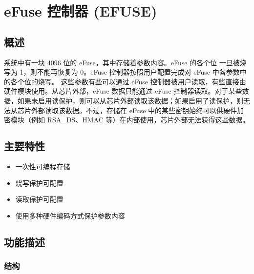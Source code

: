 \documentclass[main\_\_CN.tex]{subfiles}
\begin{document}

\ifglobal
\else
    {\let\clearpage\relax \listoftodos}
    \tableofcontents
\fi


\chapter{eFuse 控制器 (EFUSE)}
\label{mod:efuse}
\hypertarget{efuse}{}

\section{概述}

\chipname{} 系统中有一块 4096 位的 eFuse，其中存储着参数内容。eFuse 的各个位 一旦被烧写为 1，则不能再恢复为 0。eFuse 控制器按照用户配置完成对 eFuse 中各参数中的各个位的烧写。
这些参数有些可以通过 eFuse 控制器被用户读取，有些直接由硬件模块使用。从芯片外部，eFuse 数据只能通过 eFuse 控制器读取。对于某些数据，如果未启用读保护，则可以从芯片外部读取该数据；如果启用了读保护，则无法从芯片外部读取该数据。不过，存储在 eFuse 中的某些密钥始终可以供硬件加密模块（例如 RSA\_DS、HMAC 等）在内部使用，芯片外部无法获得这些数据。



\section{主要特性}

\begin{itemize}
    \item 一次性可编程存储
    \item 烧写保护可配置
    \item 读取保护可配置
    \item 使用多种硬件编码方式保护参数内容
\end{itemize}


\section{功能描述}

\subsection{结构}
\end{document}
